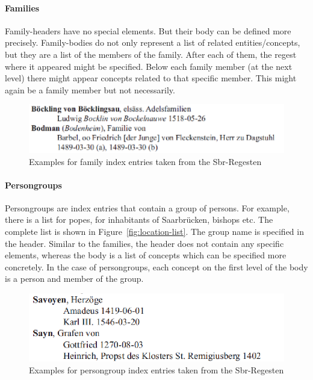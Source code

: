 \paragraph{Families}
Family-headers have no special elements. But their body can be defined
more precisely. Family-bodies do not only represent a list of related
entities/concepts, but they are a list of the members of the family.
After each of them, the regest where it appeared might be specified.
Below each family member (at the next level) there might appear
concepts related to that specific member. This might again be a family
member but not necessarily.

\begin{figure}[h]
  \centering
  \includegraphics[scale=0.45]{img/family-example}
  \caption{Examples for family index entries taken from the
    Sbr-Regesten}
  \label{fig:family-example}
\end{figure}

\paragraph{Persongroups}
Persongroups are index entries that contain a group of persons. For
example, there is a list for popes, for inhabitants of Saarbrücken,
bishops etc. The complete list is shown in
Figure~\ref{fig:location-list}. The group name is specified in the
header. Similar to the families, the header does not contain any
specific elements, whereas the body is a list of concepts which can be
specified more concretely. In the case of persongroups, each concept
on the first level of the body is a person and member of the
group. %

\begin{figure}[h]
  \centering
  \includegraphics[scale=0.45]{img/persongroup-example}
  \caption{Examples for persongroup index entries taken from the
    Sbr-Regesten}
  \label{fig:persongroup-example}
\end{figure}

